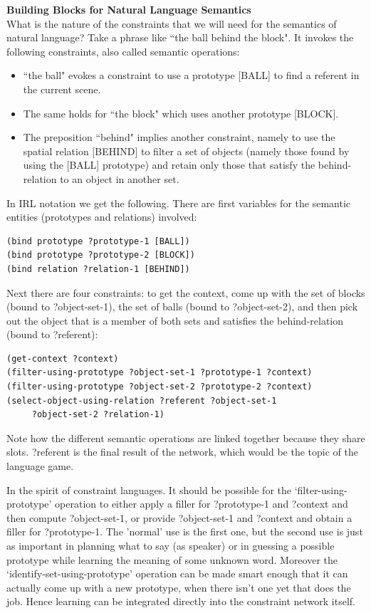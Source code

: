 {\bf Building Blocks for Natural Language Semantics }\\

What is the nature of the constraints that we will need for the semantics of natural language? 
Take a phrase like ``the ball behind the block". It invokes the following constraints, also called 
semantic operations: 
\begin{itemize}
\item ``the ball" evokes a constraint to use a prototype [BALL] to find a referent in the current scene.
\item The same holds for ``the block" which uses another prototype [BLOCK]. 
\item The preposition ``behind" implies another constraint, namely to use the spatial relation [BEHIND] to filter a 
set of objects (namely those found by using the [BALL] prototype) and retain only those that satisfy the behind-relation 
to an object in another set. 
\end{itemize} 

In IRL notation we get the following. There are first variables for the semantic entities (prototypes and relations) 
involved:
\begin{verbatim}
(bind prototype ?prototype-1 [BALL])
(bind prototype ?prototype-2 [BLOCK])
(bind relation ?relation-1 [BEHIND])
\end{verbatim}
Next there are four constraints: to get the context, come up with the set of blocks
(bound to ?object-set-1), the set of balls (bound to ?object-set-2), and then pick out the object 
that is a member of both sets and satisfies the behind-relation (bound to ?referent): 
\begin{verbatim}
(get-context ?context)
(filter-using-prototype ?object-set-1 ?prototype-1 ?context)
(filter-using-prototype ?object-set-2 ?prototype-2 ?context)
(select-object-using-relation ?referent ?object-set-1
     ?object-set-2 ?relation-1)
\end{verbatim}
Note how the different semantic operations are linked together because they share slots.
?referent is the final result of the network, which would be the topic of the language game. 

In the spirit of constraint languages. It should be possible for the `filter-using-prototype' operation
to either apply a filler for ?prototype-1 and 
?context and then compute ?object-set-1, or provide ?object-set-1 and ?context and obtain a filler for ?prototype-1. 
The 'normal' use is the first one, but the second use is just as important in planning what to
say (as speaker) or in guessing a possible prototype while learning the meaning of some unknown word. 
Moreover the `identify-set-using-prototype' operation can be made smart enough that it can actually come up with
a new prototype, when there isn't one yet that does the job. Hence learning can be 
integrated directly into the constraint network itself. 


